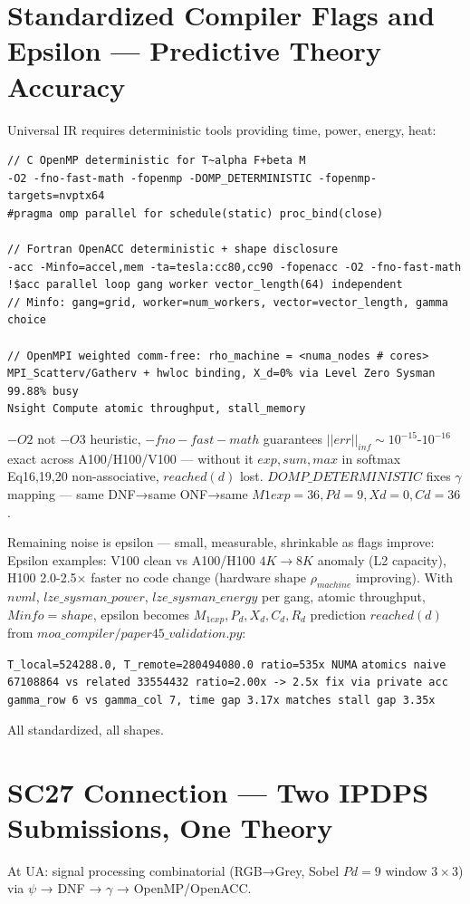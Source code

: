 \documentclass[11pt]{article}
\begin{document}
\section{Standardized Compiler Flags and Epsilon — Predictive Theory Accuracy}
Universal IR requires deterministic tools providing time, power, energy, heat:

\begin{lstlisting}
// C OpenMP deterministic for T~alpha F+beta M
-O2 -fno-fast-math -fopenmp -DOMP_DETERMINISTIC -fopenmp-targets=nvptx64
#pragma omp parallel for schedule(static) proc_bind(close)

// Fortran OpenACC deterministic + shape disclosure
-acc -Minfo=accel,mem -ta=tesla:cc80,cc90 -fopenacc -O2 -fno-fast-math
!$acc parallel loop gang worker vector_length(64) independent
// Minfo: gang=grid, worker=num_workers, vector=vector_length, gamma choice

// OpenMPI weighted comm-free: rho_machine = <numa_nodes # cores>
MPI_Scatterv/Gatherv + hwloc binding, X_d=0% via Level Zero Sysman 99.88% busy
Nsight Compute atomic throughput, stall_memory
\end{lstlisting}

$-O2$ not $-O3$ heuristic, $-fno-fast-math$ guarantees $||err||_{inf}\sim10^{-15}$-$10^{-16}$ exact across A100/H100/V100 — without it $exp,sum,max$ in softmax Eq16,19,20 non-associative, $reached(d)$ lost. $DOMP\_DETERMINISTIC$ fixes $\gamma$ mapping — same DNF→same ONF→same $M1exp=36,Pd=9,Xd=0,Cd=36$.

Remaining noise is epsilon — small, measurable, shrinkable as flags improve:
Epsilon examples: V100 clean vs A100/H100 $4K\to8K$ anomaly (L2 capacity), H100 2.0-2.5$\times$ faster no code change (hardware shape $\rho_{machine}$ improving). With $nvml$, $lze\_sysman\_power$, $lze\_sysman\_energy$ per gang, atomic throughput, $Minfo=shape$, epsilon becomes $M_{1exp},P_d,X_d,C_d,R_d$ prediction $reached(d)$ from $moa\_compiler/paper45\_validation.py$:

\texttt{T\_local=524288.0, T\_remote=280494080.0 ratio=535x NUMA}
\texttt{atomics naive 67108864 vs related 33554432 ratio=2.00x -> 2.5x fix via private acc}
\texttt{gamma\_row 6 vs gamma\_col 7, time gap 3.17x matches stall gap 3.35x}

All standardized, all shapes.

\section{SC27 Connection — Two IPDPS Submissions, One Theory}
At UA: signal processing combinatorial (RGB→Grey, Sobel $Pd=9$ window $3\times3$) via $\psi$ → DNF → $\gamma$ → OpenMP/OpenACC.
\end{document}
